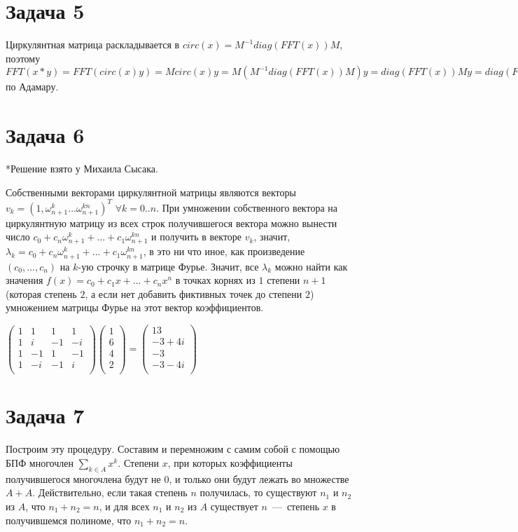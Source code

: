 \documentclass[a4paper,12pt]{article} %
\begin{document}
\section{Задача 5}
\hspace{5mm}
Циркулянтная матрица раскладывается в $circ(x)=M^{-1}diag(FFT(x))M$, поэтому $FFT(x*y)=FFT(circ(x)y)=M circ(x)y = M(M^{-1}diag(FFT(x))M)y=diag(FFT(x))My=diag(FFT(x))FFT(y)=FFT(x)\times FFT(y)$ по Адамару.

\section{Задача 6}
\hspace{5mm}
*Решение взято у Михаила Сысака.

Собственными векторами циркулянтной матрицы являются векторы $v_k=(1,\omega_{n+1}^{k}\ldots\omega_{n+1}^{kn})^{T}$ $\forall k=0..n$. При умножении собственного вектора на циркулянтную матрицу из всех строк получившегося вектора можно вынести число $c_0+c_n\omega_{n+1}^k+\ldots+c_1\omega_{n+1}^{kn}$ и получить в векторе $v_k$, 
значит, $\lambda_k=c_0+c_n\omega_{n+1}^k+\ldots+c_1\omega_{n+1}^{kn}$, в это ни что иное, как произведение $(c_0,\ldots,c_n)$ на $k$-ую строчку в матрице Фурье. 
Значит, все $\lambda_k$ можно найти как значения $f(x)=c_0+c_1x+\ldots+c_nx^n$ в 
точках корнях из $1$ степени $n+1$ (которая степень $2$, а если нет добавить фиктивных точек до степени $2$) умножением матрицы Фурье на этот вектор коэффициентов.

$\begin{pmatrix}
	1  & 1& 1& 1\\
	1  & i& -1& -i\\
	1  & -1& 1& -1\\
	1  & -i& -1& i\\
\end{pmatrix}\begin{pmatrix}
1  \\
6  \\
4  \\
2  \\
\end{pmatrix}=\begin{pmatrix}
13  \\
-3+4i  \\
-3  \\
-3-4i  \\
\end{pmatrix}$

\section{Задача 7}
\hspace{5mm}
Построим эту процедуру. Составим и перемножим с самим собой с помощью БПФ многочлен $\sum\limits_{k\in A}x^k$. Степени $x$, при которых коэффициенты получившегося многочлена будут не $0$, и только они будут лежать во множестве $A+A$. Действительно, если такая степень $n$ получилась, то существуют $n_1$ и $n_2$ из $A$, что $n_1+n_2=n$, и для всех $n_1$ и $n_2$ из $A$ существует $n$~---~степень $x$ в получившемся полиноме, что $n_1+n_2=n$.
\end{document}
